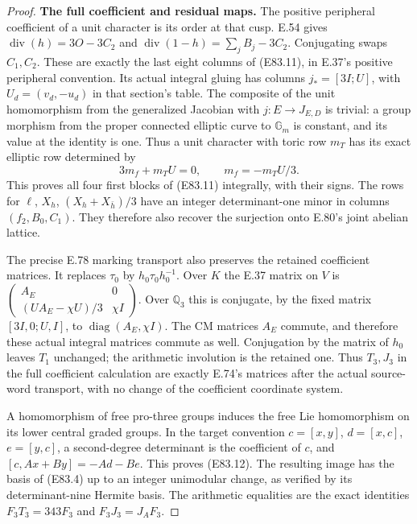 \begin{proof}
\textbf{The full coefficient and residual maps.}
The positive peripheral coefficient of a unit
character is its order at that cusp. E.54 gives
$\operatorname{div}(h)=3O-3C_2$ and
$\operatorname{div}(1-h)=\sum_jB_j-3C_2$.
Conjugating swaps $C_1,C_2$. These are exactly
the last eight columns of (E83.11), in E.37's
positive peripheral convention. Its actual
integral gluing has columns $j_*=[3I;U]$, with
$U_d=(v_d,-u_d)$ in that section's table.
The composite of the unit homomorphism from
the generalized Jacobian with $j:E\to J_{E,D}$
is trivial: a group morphism from the proper
connected elliptic curve to $\mathbb G_m$ is
constant, and its value at the identity is one.
Thus a unit character with toric row $m_T$
has its exact elliptic row determined by
\[
                3m_f+m_TU=0,
                    \qquad m_f=-m_TU/3.
 \tag{E83.19}
\]
This proves all four first blocks of (E83.11)
integrally, with their signs. The rows for
$\ell$, $X_h$, $(X_h+X_{\bar h})/3$ have an
integer determinant-one minor in columns
$(f_2,B_0,C_1)$. They therefore also recover
the surjection onto E.80's joint abelian lattice.

The precise E.78 marking transport also preserves
the retained coefficient matrices. It replaces
$\tau_0$ by $h_0\tau_0h_0^{-1}$. Over $K$ the
E.37 matrix on $V$ is
$\left(\begin{smallmatrix}A_E&0\\
(UA_E-\chi U)/3&\chi I\end{smallmatrix}\right)$.
Over $\mathbb Q_3$ this is conjugate, by the fixed
matrix $[3I,0;U,I]$, to
$\operatorname{diag}(A_E,\chi I)$. The CM matrices
$A_E$ commute, and therefore these actual integral
matrices commute as well. Conjugation by the
matrix of $h_0$ leaves $T_1$ unchanged; the
arithmetic involution is the retained one.
Thus $T_3,J_3$ in the full coefficient calculation
are exactly E.74's matrices after the actual
source-word transport, with no change of the
coefficient coordinate system.

A homomorphism of free pro-three groups induces
the free Lie homomorphism on its lower central
graded groups. In the target convention
$c=[x,y]$, $d=[x,c]$, $e=[y,c]$, a second-degree
determinant is the coefficient of $c$, and
$[c,Ax+By]=-Ad-Be$. This proves (E83.12).
The resulting image has the basis of (E83.4)
up to an integer unimodular change, as verified
by its determinant-nine Hermite basis. The
arithmetic equalities are the exact identities
$F_3T_3=343F_3$ and $F_3J_3=J_AF_3$.


\end{proof}
